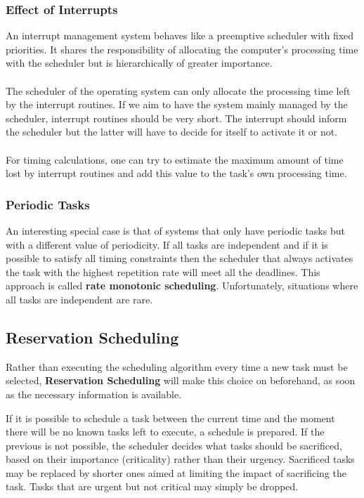 \documentclass[../main.tex]{subfiles}
\begin{document}
\subsubsection{Effect of Interrupts}
An interrupt management system behaves like a preemptive scheduler with fixed priorities. It shares the responsibility of allocating the computer's processing time with the scheduler but is hierarchically of greater importance.
\\\\
The scheduler of the operating system can only allocate the processing time left by the interrupt routines. If we aim to have the system mainly managed by the scheduler, interrupt routines should be very short. The interrupt should inform the scheduler but the latter will have to decide for itself to activate it or not.
\\\\
For timing calculations, one can try to estimate the maximum amount of time lost by interrupt routines and add this value to the task's own processing time.

\subsubsection{Periodic Tasks}
An interesting special case is that of systems that only  have periodic tasks but with a different value of periodicity. If all tasks are independent and if it is possible to satisfy all timing constraints then the scheduler that always activates the task with the highest repetition rate will meet all the deadlines. This approach is called \textbf{rate monotonic scheduling}. Unfortunately, situations where all tasks are independent are rare.

\subsection{Reservation Scheduling}
Rather than executing the scheduling algorithm every time a new task must be selected, \textbf{Reservation Scheduling} will make this choice on beforehand, as soon as the necessary information is available. 

If it is possible to schedule a task between the current time and the moment there will be no known tasks left to execute, a schedule is prepared. If the previous is not possible, the scheduler decides what tasks should be sacrificed, based on their importance (criticality) rather than their urgency. Sacrificed tasks may be replaced by shorter ones aimed at limiting the impact of sacrificing the task. Tasks that are urgent but not critical may simply be dropped.
\end{document}
